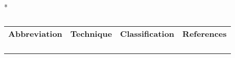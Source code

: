 \begin{table}{*}
\caption{}
\label{table:Ambient_Ionisation}

\centering 
\scriptsize

    \begin{tabular}{|c|c|c|l|}
         \textbf{Abbreviation}  & \textbf{Technique} & \textbf{Classification} & \textbf{References} \\ 
         &  &  &  \\ 
         &  &  &  \\ 
         &  &  &  \\ 
         &  &  &  \\ 
    \end{tabular} 
\end{table}